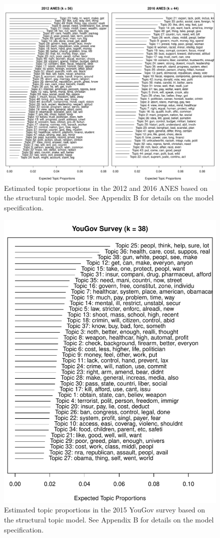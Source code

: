 \begin{figure}[h]\centering
\includegraphics[width=\textwidth]{../fig/anes_stm_prop.pdf}
\caption{Estimated topic proportions in the 2012 and 2016 ANES based on the structural topic model. See Appendix B for details on the model specification.}\label{fig:anes_stm_prop}
\end{figure}

\begin{figure}[h]\centering
\includegraphics[width=.5\textwidth]{../fig/yg_stm_prop.pdf}
\caption{Estimated topic proportions in the 2015 YouGov survey based on the structural topic model. See Appendix B for details on the model specification.}\label{fig:yg_stm_prop}
\end{figure}


